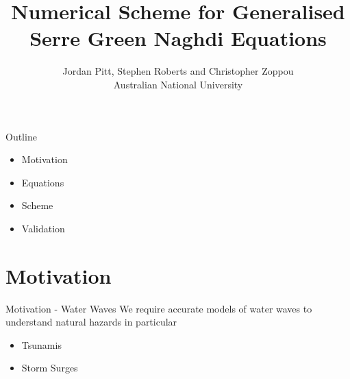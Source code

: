 \documentclass[pdf]{beamer}
\title{Numerical Scheme for Generalised Serre Green Naghdi Equations}
\author{Jordan Pitt, Stephen Roberts and Christopher Zoppou \\ Australian National University}
\begin{document}
	
\begin{frame}[plain]{}
\end{frame}

\begin{frame}
	\titlepage
\end{frame}


\begin{frame}{Outline}
	\begin{itemize}
		\item Motivation
		\item Equations
		\item Scheme
		\item Validation
	\end{itemize}
\end{frame}
\section{Motivation}
\begin{frame}{Motivation - Water Waves}
We require accurate models of water waves to understand natural hazards in particular
	\begin{itemize}
		\item Tsunamis
		\item Storm Surges
	\end{itemize}
\end{frame}
\end{document}
